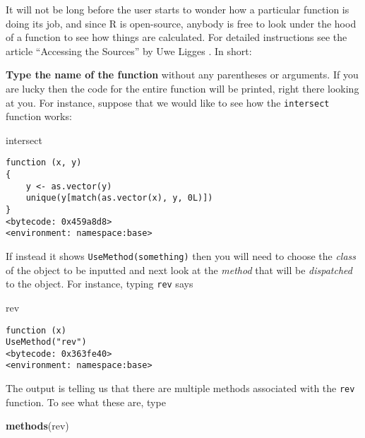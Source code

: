\documentclass[]{book}
\newenvironment{Shaded}{\begin{snugshade}}{\end{snugshade}}
\newcommand{\KeywordTok}[1]{\textcolor[rgb]{0.13,0.29,0.53}{\textbf{{#1}}}}
\newcommand{\NormalTok}[1]{{#1}}
\numberwithin{equation}{chapter}
\numberwithin{figure}{chapter}
\theoremstyle{plain}
\theoremstyle{definition}
\theoremstyle{remark}
\theoremstyle{definition}
\theoremstyle{definition}
\theoremstyle{remark}
\begin{document}
It will not be long before the user starts to wonder how a particular
function is doing its job, and since R is open-source, anybody is free
to look under the hood of a function to see how things are calculated.
For detailed instructions see the article ``Accessing the Sources'' by
Uwe Ligges \autocite{Ligges2006}. In short:

\textbf{Type the name of the function} without any parentheses or
arguments. If you are lucky then the code for the entire function will
be printed, right there looking at you. For instance, suppose that we
would like to see how the \texttt{intersect}
 function works:

\begin{Shaded}
\begin{Highlighting}[]
\NormalTok{intersect}
\end{Highlighting}
\end{Shaded}

\begin{verbatim}
function (x, y) 
{
    y <- as.vector(y)
    unique(y[match(as.vector(x), y, 0L)])
}
<bytecode: 0x459a8d8>
<environment: namespace:base>
\end{verbatim}

If instead it shows \texttt{UseMethod(something)}
 then you will need to choose the
\emph{class} of the object to be inputted and next look at the
\emph{method} that will be \emph{dispatched} to the object. For
instance, typing \texttt{rev}  says

\begin{Shaded}
\begin{Highlighting}[]
\NormalTok{rev}
\end{Highlighting}
\end{Shaded}

\begin{verbatim}
function (x) 
UseMethod("rev")
<bytecode: 0x363fe40>
<environment: namespace:base>
\end{verbatim}

The output is telling us that there are multiple methods associated with
the \texttt{rev} function. To see what these are, type

\begin{Shaded}
\begin{Highlighting}[]
\KeywordTok{methods}\NormalTok{(rev)}
\end{Highlighting}
\end{Shaded}
\end{document}
